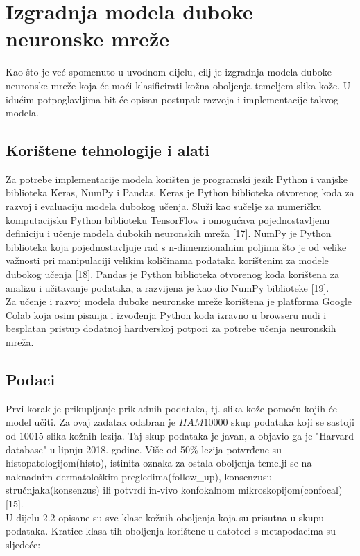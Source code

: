 \documentclass[times, utf8, zavrsni]{fer}
\begin{document}
\chapter{Izgradnja modela duboke neuronske mreže}
Kao što je već spomenuto u uvodnom dijelu, cilj je izgradnja modela duboke neuronske mreže koja će moći klasificirati kožna oboljenja temeljem slika kože. U idućim potpoglavljima bit će opisan postupak razvoja i implementacije takvog modela.
\section{Korištene tehnologije i alati}
\indent{}
Za potrebe implementacije modela korišten je programski jezik Python i vanjske biblioteka Keras, NumPy i Pandas. Keras je Python biblioteka otvorenog koda  za razvoj i evaluaciju modela dubokog učenja. Služi kao sučelje za numeričku komputacijsku Python biblioteku TensorFlow i omogućava pojednostavljenu definiciju i učenje modela dubokih neuronskih mreža [17]. NumPy je Python biblioteka koja pojednostavljuje rad s n-dimenzionalnim poljima što je od velike važnosti pri manipulaciji velikim količinama podataka korištenim za modele dubokog učenja [18]. Pandas je Python biblioteka otvorenog koda korištena za analizu i učitavanje podataka, a razvijena je kao dio NumPy biblioteke [19].\\ 
\indent{}
Za učenje i razvoj modela duboke neuronske mreže korištena je platforma Google Colab koja osim pisanja i izvođenja Python koda izravno u browseru nudi i besplatan pristup dodatnoj hardverskoj potpori za potrebe učenja neuronskih mreža. 
\newpage
\section{Podaci}
\indent{}
Prvi korak je prikupljanje prikladnih podataka, tj. slika kože pomoću kojih će model učiti. Za ovaj zadatak odabran je $HAM10000$  skup podataka koji se sastoji od $10015$ slika kožnih lezija. Taj skup podataka je javan, a objavio ga je "Harvard database" u lipnju 2018. godine. Više od 50\% lezija potvrđene su histopatologijom(histo), istinita oznaka za ostala oboljenja  temelji se na naknadnim dermatološkim pregledima(follow\_up), konsenzusu stručnjaka(konsenzus) ili potvrdi in-vivo konfokalnom mikroskopijom(confocal) [15].\\
\indent{}
U dijelu 2.2 opisane su sve klase kožnih oboljenja koja su prisutna u skupu podataka. Kratice klasa tih oboljenja korištene u datoteci s metapodacima su sljedeće:
\end{document}
